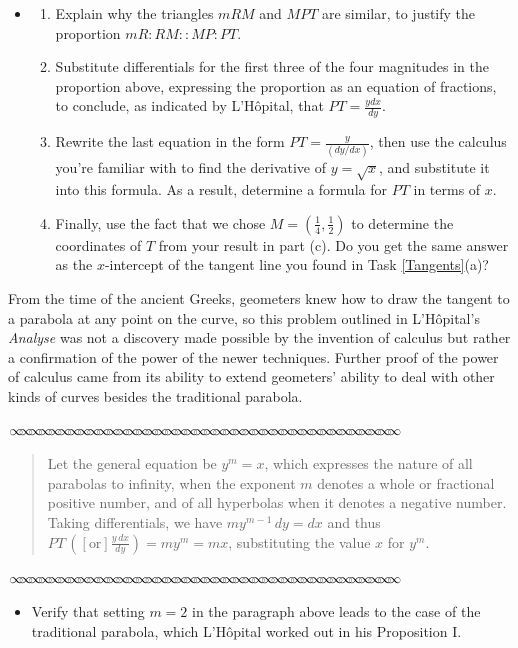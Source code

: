 \message{ !name(LHopitalsRule_2021.03.29.tex)}\documentclass[11pt]{article}
\newcommand{\sep}{\vspace{-3pt}
\begin{center}
{\mathversion{normal}
$\infty \mspace{-5.5mu}\infty \mspace{-5.5mu}\infty \mspace{-5.5mu}\infty \mspace{-5.5mu}
\infty \mspace{-5.5mu}\infty \mspace{-5.5mu}\infty \mspace{-5.5mu}\infty \mspace{-5.5mu}
\infty \mspace{-5.5mu}\infty \mspace{-5.5mu}\infty \mspace{-5.5mu}\infty \mspace{-5.5mu}
\infty \mspace{-5.5mu}\infty \mspace{-5.5mu}\infty \mspace{-5.5mu}\infty \mspace{-5.5mu}
\infty \mspace{-5.5mu}\infty \mspace{-5.5mu}\infty \mspace{-5.5mu}\infty \mspace{-5.5mu}
\infty \mspace{-5.5mu}\infty \mspace{-5.5mu}\infty \mspace{-5.5mu}\infty \mspace{-5.5mu}
\infty \mspace{-5.5mu}\infty \mspace{-5.5mu}\infty \mspace{-5.5mu}\infty \mspace{-5.5mu}
\infty \mspace{-5.5mu}\infty \mspace{-5.5mu}\infty \mspace{-5.5mu}\infty \mspace{-5.5mu}
\infty \mspace{-5.5mu}\infty \mspace{-5.5mu}\infty \mspace{-5.5mu}\infty \mspace{-5.5mu}
\infty \mspace{-5.5mu}\infty \mspace{-5.5mu}\infty \mspace{-5.5mu}\infty \mspace{-5.5mu}$}
\end{center} \vspace*{-5pt}}
\newenvironment{source}%
 {\bigskip \sep \vspace*{-6pt} \begin{quote}
          \begin{sf}   }
   {   \end{sf}     \end{quote} \vspace*{-6pt} \sep \bigskip}%
\newcounter{tasknumb}
\newcommand{\tasknumb}[1]{\refstepcounter{tasknumb}\textmd{\textbf{$\fbox{$\fbox{Task \thetasknumb}$}$}}#1}
\newenvironment{task}[1][]%
 {\begin{itemize}
 \item[\tasknumb{#1}] }
{
    \end{itemize}    }%
\begin{document}
\smallskip
\begin{task}[\label{find_tangent}]
\begin{enumerate} \itemsep -5pt
\item[(a)] Explain why the triangles $mRM$ and $MPT$ are similar, to justify the proportion $mR : RM :: MP : PT$. \\
\item[(b)] Substitute differentials for the first three of the four magnitudes in the proportion above, expressing the proportion as an equation of fractions, to conclude, as indicated by L'H\^opital, that $PT=\frac{ydx}{dy}$. \\
\item[(c)] Rewrite the last equation in the form $PT=\frac{y}{(dy/dx)}$, then use the calculus you're familiar with to find the derivative of $y=\sqrt{x}$, and substitute it into this formula. As a result, determine a formula for $PT$ in terms of $x$. \\
\item[(d)] Finally, use the fact that we chose $M=(\frac14, \frac12)$ to determine the coordinates of $T$ from your result in part (c). Do you get the same answer as the $x$-intercept of the tangent line you found in Task \ref{Tangents}(a)?
\end{enumerate}

 \end{task}

\smallskip
From the time of the ancient Greeks, geometers knew how to draw the tangent to a parabola at any point on the curve, so this problem outlined in L'H\^opital's \emph{Analyse} was not a discovery made possible by the invention of calculus but rather a confirmation of the power of the newer techniques. Further proof of the power of calculus came from its ability to extend geometers' ability to deal with other kinds of curves besides the traditional parabola.

\smallskip
\begin{source}
Let the general equation be $y^m=x$, which expresses the nature of all parabolas to infinity, when the exponent $m$ denotes a whole or fractional positive number, and of all hyperbolas when it denotes a negative number. Taking differentials, we have $my^{m-1}\,dy=dx$ and thus $PT\,\left([\textrm{or}] \frac{y\,dx}{dy}\right)=my^m=mx$, substituting the value $x$ for $y^m$.
\end{source}

\bigskip
\begin{task}[\label{traditional_parabola}]
Verify that setting $m=2$ in the paragraph above leads to the case of the traditional parabola, which L'H\^opital worked out in his Proposition I.
 \end{task}
\end{document}
